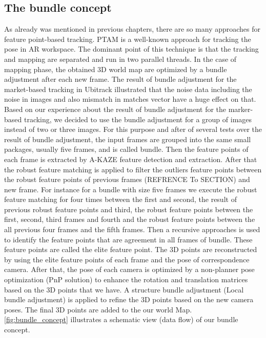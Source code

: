 \subsection{The bundle concept}
As already was mentioned in previous chapters, there are so many approaches for feature point-based tracking. PTAM \cite{klein2007parallel} is a well-known approach for tracking the pose in AR workspace. The dominant point of this technique is that the tracking and mapping are separated and run in two parallel threads. In the case of mapping phase, the obtained 3D world map are optimized by a bundle adjustment after each new frame. The result of bundle adjustment for the market-based tracking in Ubitrack illustrated that the noise data including the noise in images and also mismatch in matches vector have a huge effect on that.\\
Based on our experience about the result of bundle adjustment for the marker-based tracking, we decided to use the bundle adjustment for a group of images instead of two or three images. For this purpose and after of several tests over the result of bundle adjustment, the input frames are grouped into the same small packages, usually five frames, and is called bundle. Then the feature points of each frame is extracted by A-KAZE feature detection and extraction. After that the robust feature matching is applied to filter the outliers feature points between the robust feature points of previous frames (REFRENCE To SECTION) and new frame. For instance for a bundle with size five frames we execute the robust feature matching for four times between the first and second, the result of previous robust feature points and third, the robust feature points between the first, second, third frames and fourth and the robust feature points between the all previous four frames and the fifth frames. Then a recursive approaches is used to identify the feature points that are agreement in all frames of bundle. These feature points are called the elite feature point. The 3D points are reconstructed by using the elite feature points of each frame and the pose of correspondence camera. After that, the pose of each camera is optimized by a non-planner pose optimization (PnP solution) to enhance the rotation and translation matrices based on the 3D points that we have. A structure bundle adjustment (Local bundle adjustment) is applied to refine the 3D points based on the new camera poses. The final 3D points are added to the our world Map.\\
\autoref{fig:bundle_concept} illustrates a schematic view (data flow) of our bundle concept.

